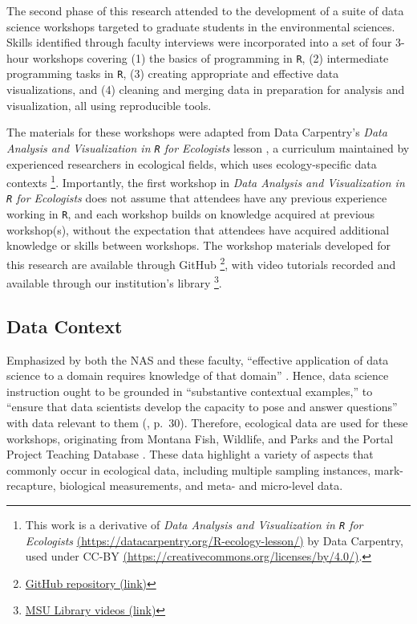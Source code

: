 \documentclass[12pt]{article}
\begin{document}
\quad The second phase of this research attended to the  development of a suite
of data science workshops targeted to graduate students in the environmental
sciences. Skills identified through faculty interviews were incorporated into a
set of four 3-hour workshops covering (1) the basics of programming in 
\texttt{R}, (2) intermediate programming tasks in \texttt{R}, (3) creating
appropriate and effective data visualizations, and (4) cleaning and merging data
in preparation for analysis and visualization, all using reproducible tools. 

\quad The materials for these workshops were adapted from Data Carpentry's 
\emph{Data Analysis and Visualization in \texttt{R} for Ecologists} lesson 
\citep{ecology_curriculum}, a curriculum maintained by experienced researchers
in ecological fields, which uses ecology-specific data contexts \footnote{This
work is a derivative of \emph{Data Analysis and Visualization in \texttt{R} for
Ecologists} \href{https://datacarpentry.org/R-ecology-lesson/}{(https://datacarpentry.org/R-ecology-lesson/)}
by Data Carpentry, used under CC-BY 
\href{https://creativecommons.org/licenses/by/4.0/}{(https://creativecommons.org/licenses/by/4.0/)}.}.
Importantly, the first workshop in \emph{Data Analysis and Visualization in 
\texttt{R} for Ecologists} does not assume that attendees have any previous
experience working in \texttt{R}, and each workshop builds on knowledge acquired
at previous workshop(s), without the expectation that attendees have acquired
additional knowledge or skills between workshops. The workshop materials
developed for this research are available through GitHub
\footnote{\href{https://github.com/atheobold/data-science-workshops-jse}{GitHub
repository (link)}}, with video tutorials recorded and available through our
institution's library 
\footnote{\href{http://bit.ly/ws_recordings}{MSU Library videos (link)}}.  


\subsection{Data Context}  

\quad Emphasized by both the NAS and these faculty, ``effective application of
data science to a domain requires knowledge of that domain'' \citep[p.\ 29]{nas}. 
Hence, data science instruction ought to be grounded in ``substantive contextual
examples,'' to ``ensure that data scientists develop the capacity to pose and
answer questions'' with data relevant to them (\citeyear{nas}, p.\ 30). 
Therefore, ecological data are used for these workshops, originating from 
Montana Fish, Wildlife, and Parks and the Portal Project Teaching Database 
\citep{portal_data}. These data highlight a variety of aspects that
commonly occur in ecological data, including multiple sampling instances,
mark-recapture, biological measurements, and meta- and micro-level data. 
\end{document}
